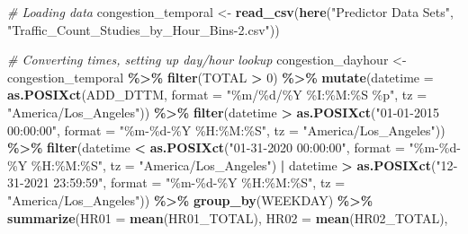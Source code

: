 \documentclass[
  12pt,
]{article}
\newenvironment{Shaded}{\begin{snugshade}}{\end{snugshade}}
\newcommand{\AttributeTok}[1]{\textcolor[rgb]{0.13,0.29,0.53}{#1}}
\newcommand{\CommentTok}[1]{\textcolor[rgb]{0.56,0.35,0.01}{\textit{#1}}}
\newcommand{\DecValTok}[1]{\textcolor[rgb]{0.00,0.00,0.81}{#1}}
\newcommand{\FunctionTok}[1]{\textcolor[rgb]{0.13,0.29,0.53}{\textbf{#1}}}
\newcommand{\NormalTok}[1]{#1}
\newcommand{\OtherTok}[1]{\textcolor[rgb]{0.56,0.35,0.01}{#1}}
\newcommand{\SpecialCharTok}[1]{\textcolor[rgb]{0.81,0.36,0.00}{\textbf{#1}}}
\newcommand{\StringTok}[1]{\textcolor[rgb]{0.31,0.60,0.02}{#1}}
\begin{document}
\begin{Shaded}
\begin{Highlighting}[]
\CommentTok{\# Loading data}
\NormalTok{congestion\_temporal }\OtherTok{\textless{}{-}} \FunctionTok{read\_csv}\NormalTok{(}\FunctionTok{here}\NormalTok{(}\StringTok{"Predictor Data Sets"}\NormalTok{,}
                                \StringTok{"Traffic\_Count\_Studies\_by\_Hour\_Bins{-}2.csv"}\NormalTok{))}

\CommentTok{\# Converting times, setting up day/hour lookup}
\NormalTok{congestion\_dayhour }\OtherTok{\textless{}{-}}\NormalTok{ congestion\_temporal }\SpecialCharTok{\%\textgreater{}\%}
  \FunctionTok{filter}\NormalTok{(TOTAL }\SpecialCharTok{\textgreater{}} \DecValTok{0}\NormalTok{) }\SpecialCharTok{\%\textgreater{}\%}
  \FunctionTok{mutate}\NormalTok{(}\AttributeTok{datetime =} \FunctionTok{as.POSIXct}\NormalTok{(ADD\_DTTM, }
                               \AttributeTok{format =} \StringTok{"\%m/\%d/\%Y \%I:\%M:\%S \%p"}\NormalTok{, }
                               \AttributeTok{tz =} \StringTok{"America/Los\_Angeles"}\NormalTok{)) }\SpecialCharTok{\%\textgreater{}\%}
  \FunctionTok{filter}\NormalTok{(datetime }\SpecialCharTok{\textgreater{}} \FunctionTok{as.POSIXct}\NormalTok{(}\StringTok{"01{-}01{-}2015 00:00:00"}\NormalTok{, }
                               \AttributeTok{format =} \StringTok{"\%m{-}\%d{-}\%Y \%H:\%M:\%S"}\NormalTok{,}
                               \AttributeTok{tz =} \StringTok{"America/Los\_Angeles"}\NormalTok{)) }\SpecialCharTok{\%\textgreater{}\%}
  \FunctionTok{filter}\NormalTok{(datetime }\SpecialCharTok{\textless{}} \FunctionTok{as.POSIXct}\NormalTok{(}\StringTok{"01{-}31{-}2020 00:00:00"}\NormalTok{, }
                               \AttributeTok{format =} \StringTok{"\%m{-}\%d{-}\%Y \%H:\%M:\%S"}\NormalTok{,}
                               \AttributeTok{tz =} \StringTok{"America/Los\_Angeles"}\NormalTok{) }\SpecialCharTok{|}
\NormalTok{           datetime }\SpecialCharTok{\textgreater{}} \FunctionTok{as.POSIXct}\NormalTok{(}\StringTok{"12{-}31{-}2021 23:59:59"}\NormalTok{, }
                               \AttributeTok{format =} \StringTok{"\%m{-}\%d{-}\%Y \%H:\%M:\%S"}\NormalTok{,}
                               \AttributeTok{tz =} \StringTok{"America/Los\_Angeles"}\NormalTok{)) }\SpecialCharTok{\%\textgreater{}\%}
  \FunctionTok{group\_by}\NormalTok{(WEEKDAY) }\SpecialCharTok{\%\textgreater{}\%}
  \FunctionTok{summarize}\NormalTok{(}\AttributeTok{HR01 =} \FunctionTok{mean}\NormalTok{(HR01\_TOTAL),}
            \AttributeTok{HR02 =} \FunctionTok{mean}\NormalTok{(HR02\_TOTAL),}

\end{Highlighting}
\end{Shaded}
\end{document}
